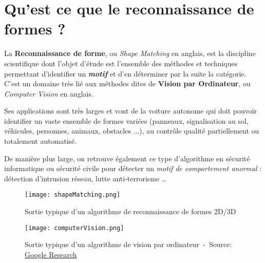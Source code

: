 \section{Qu'est ce que le reconnaissance de formes ?}

La \textbf{Reconnaissance de forme}, ou \textit{Shape Matching} en anglais, est la discipline scientifique dont l'objet d'étude est l'ensemble des méthodes et techniques permettant d'identifier un \textbf{\textit{motif}} et d'en déterminer par la suite la catégorie. C'est un domaine très lié aux méthodes dites de \textbf{Vision par Ordinateur}, ou \textit{Computer Vision} en anglais.

Ses applications sont très larges et vont de la voiture autonome qui doit pouvoir identifier un vaste ensemble de formes variées (panneaux, signalisation au sol, véhicules, personnes, animaux, obstacles ...), au contrôle qualité partiellement ou totalement automatisé.

De manière plus large, on retrouve également ce type d'algorithme en sécurité informatique ou sécurité civile pour détecter un \textit{motif de comportement anormal} : détection d'intrusion réseau, lutte anti-terrorisme \ldots

 \begin{figure}[H]
    \centering
    \texttt{[image: shapeMatching.png]}
	\caption{Sortie typique d'un algorithme de reconnaissance de formes 2D/3D~\cite{shapeMatchingImg}}\label{image.shapeMatching} 
\end{figure}

 \begin{figure}[H]
    \centering
    \texttt{[image: computerVision.png]}
	\caption{Sortie typique d'un algorithme de vision par ordinateur~-~Source: \href{http://googleresearch.blogspot.fr/2014/09/building-deeper-understanding-of-images.html}{Google Research}}\label{image.computerVision} 
\end{figure}